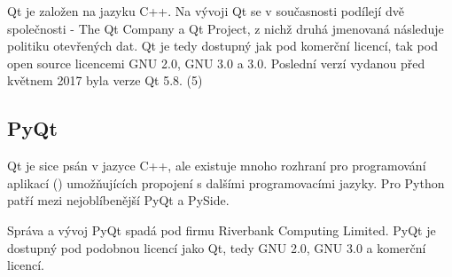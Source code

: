 Qt je založen na jazyku C++. Na vývoji Qt se v současnosti podílejí
dvě společnosti - The Qt Company a Qt Project, z nichž druhá jmenovaná
následuje politiku otevřených dat. Qt je tedy dostupný jak pod
komerční licencí, tak pod open source licencemi GNU  2.0, GNU
 3.0 a  3.0. Poslední verzí vydanou před květnem 2017
byla verze Qt 5.8. (5)


\subsection{PyQt} Qt je sice psán v jazyce C++, ale existuje mnoho
rozhraní pro programování aplikací () umožňujících propojení s
dalšími programovacími jazyky. Pro Python patří mezi nejoblíbenější
PyQt a PySide.

Správa a vývoj PyQt spadá pod firmu Riverbank Computing Limited. PyQt
je dostupný pod podobnou licencí jako Qt, tedy GNU  2.0, GNU
 3.0 a komerční licencí.


